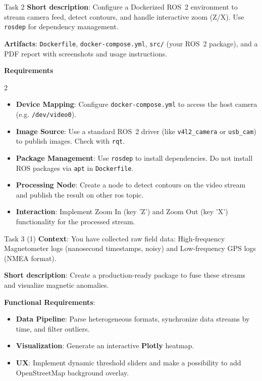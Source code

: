 \documentclass[aspectratio=169]{beamer}
\begin{document}
\begin{frame}[t]{Task 2}
\vspace{-0.3cm}
\textbf{Short description}:
Configure a Dockerized ROS~2 environment to stream camera feed, detect contours, and handle interactive zoom (Z/X). Use \texttt{rosdep} for dependency management.

\textbf{Artifacts}: \texttt{Dockerfile}, \texttt{docker-compose.yml}, \texttt{src/} (your ROS~2 package), and a PDF report with screenshots and usage instructions.


\textbf{Requirements}
\footnotesize
\vspace*{-0.4cm}
\begin{multicols}{2}
\begin{itemize}
    \item \textbf{Device Mapping}: Configure \texttt{docker-compose.yml} to access the host camera (e.g. \texttt{/dev/video0}).
    \item \textbf{Image Source}: Use a standard ROS~2 driver (like \texttt{v4l2\_camera} or \texttt{usb\_cam}) to publish images. Check with \texttt{rqt}.
    \item \textbf{Package Management}: Use \texttt{rosdep} to install dependencies. Do not install ROS packages via \texttt{apt} in \texttt{Dockerfile}.
    \item \textbf{Processing Node}: Create a node to detect contours on the video stream and publish the result on other ros topic.
    \item \textbf{Interaction}: Implement Zoom In (key 'Z') and Zoom Out (key 'X') functionality for the processed stream.
\end{itemize}
\end{multicols}

\end{frame}

\begin{frame}[t]{Task 3 (1)}
\vspace{-0.3cm}
\textbf{Context}:
You have collected raw field data: High-frequency Magnetometer logs (nanosecond timestamps, noisy) and Low-frequency GPS logs (NMEA format).



\textbf{Short description}:
Create a production-ready package to fuse these streams and visualize magnetic anomalies.

\textbf{Functional Requirements}:
\begin{itemize}
    \item \textbf{Data Pipeline}: Parse heterogeneous formats, synchronize data streams by time, and filter outliers.
    \item \textbf{Visualization}: Generate an interactive \textbf{Plotly} heatmap.
    \item \textbf{UX}: Implement dynamic threshold sliders and make a possibility to add OpenStreetMap background overlay.
\end{itemize}
\end{frame}
\end{document}
